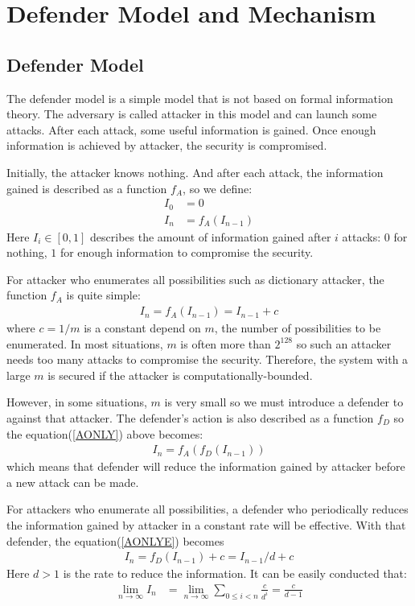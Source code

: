 \documentclass[10pt, conference, compsocconf]{IEEEtran}
\begin{document}
\section{Defender Model and Mechanism}\label{sec_def}
	\subsection{Defender Model}
		The defender model is a simple model that
		is not based on formal information theory.
		The adversary is called attacker in this model
		and can launch some attacks. After
		each attack, some useful information is gained.
		Once enough information is achieved by attacker, 
		the security is compromised.
		
		Initially, the attacker knows nothing. And after
		each attack, the information gained
		is described as a function $f_A$, so we define:
		\begin{align}
			I_0 &= 0\\
			I_n &= f_A(I_{n-1})\label{AONLY}
		\end{align}
		Here $I_i \in [0, 1]$ describes the amount of information
		gained after $i$ attacks: $0$ for nothing, $1$ for enough
		information to compromise the security.
		
		For attacker who enumerates all possibilities such
		as dictionary attacker, the
		function $f_A$ is quite simple:
		\begin{align}
			I_n = f_A(I_{n-1}) = I_{n-1}+c\label{AONLYE}
		\end{align}
		where $c = 1/m$ is a constant depend on $m$,
		the number of possibilities to be enumerated. 
		In most situations, $m$ is often more
		than $2^{128}$ so such an attacker needs too many 
		attacks to compromise the security. Therefore, the system with
		a large $m$ is secured if the attacker is computationally-bounded.
		
		However, in some situations, $m$ is very small so
		we must introduce a defender to against that attacker. 
		The defender's action is also described as a function $f_D$
		so the equation(\ref{AONLY}) above becomes:
		\begin{align}
			I_n = f_A(f_D(I_{n-1}))
		\end{align}
		which means that defender will reduce the information
		gained by attacker before a new attack can be made.
		
		For attackers who enumerate all possibilities,
		a defender 
		who periodically reduces the information gained by
		attacker in a constant rate will be effective. With
		that defender,
		the equation(\ref{AONLYE}) becomes
		\begin{align}
			I_n = f_D(I_{n-1})+c = I_{n-1}/d+c
		\end{align}
		Here $d > 1$ is the rate to reduce the information.
		It can be easily conducted that:
		\begin{align*}
			\lim_{n \rightarrow \infty} I_n &= \lim_{n \rightarrow \infty} \sum_{0 \leq i < n} \frac{c}{d^i}
				= \frac{c}{d-1}
		\end{align*}
		
\end{document}
